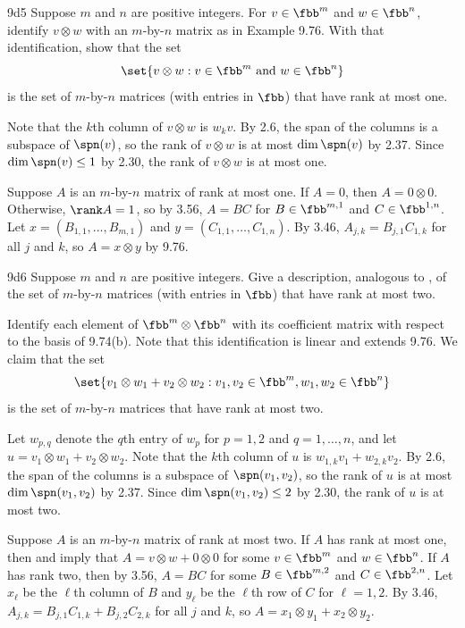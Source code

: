 \begin{exercise}{9d5}
    Suppose $m$ and $n$ are positive integers.
    For $v \in \fbb^m$ and $w \in \fbb^n$, identify $v \otimes w$ with an $m$-by-$n$ matrix as in Example 9.76.
    With that identification, show that the set
    \[
        \set{v \otimes w : v \in \fbb^m \text{ and } w \in \fbb^n}
    \]
    is the set of $m$-by-$n$ matrices (with entries in $\fbb$) that have rank at most one.
\end{exercise}

\begin{soliff}
    \rightset Note that the $k$th column of $v \otimes w$ is $w_k v$.
    By 2.6, the span of the columns is a subspace of $\spn(v)$, so the rank of $v \otimes w$ is at most $\dim \spn(v)$ by 2.37.
    Since $\dim \spn(v) \leq 1$ by 2.30, the rank of $v \otimes w$ is at most one.

    \leftset Suppose $A$ is an $m$-by-$n$ matrix of rank at most one.
    If $A = 0$, then $A = 0 \otimes 0$.
    Otherwise, $\rank A = 1$, so by 3.56, $A = BC$ for $B \in \fbb^{m, 1}$ and $C \in \fbb^{1, n}$.
    Let $x = (B_{1,1}, \ldots, B_{m,1})$ and $y = (C_{1,1}, \ldots, C_{1,n})$.
    By 3.46, $A_{j,k} = B_{j,1} C_{1,k}$ for all $j$ and $k$, so $A = x \otimes y$ by 9.76.
\end{soliff}

\begin{exercise}{9d6}
    Suppose $m$ and $n$ are positive integers.
    Give a description, analogous to , of the set of $m$-by-$n$ matrices (with entries in $\fbb$) that have rank at most two.
\end{exercise}

\begin{sol}
    Identify each element of $\fbb^m \otimes \fbb^n$ with its coefficient matrix with respect to the basis of 9.74(b).
    Note that this identification is linear and extends 9.76.
    We claim that the set
    \[
        \set{v_1 \otimes w_1 + v_2 \otimes w_2 : v_1, v_2 \in \fbb^m, w_1, w_2 \in \fbb^n}
    \]
    is the set of $m$-by-$n$ matrices that have rank at most two.
    
    \rightset Let $w_{p, q}$ denote the $q$th entry of $w_p$ for $p = 1, 2$ and $q = 1, \ldots, n$, and let $u = v_1 \otimes w_1 + v_2 \otimes w_2$.
    Note that the $k$th column of $u$ is $w_{1,k} v_1 + w_{2,k} v_2$.
    By 2.6, the span of the columns is a subspace of $\spn(v_1, v_2)$, so the rank of $u$ is at most $\dim \spn(v_1, v_2)$ by 2.37.
    Since $\dim \spn(v_1, v_2) \leq 2$ by 2.30, the rank of $u$ is at most two.

    \leftset Suppose $A$ is an $m$-by-$n$ matrix of rank at most two.
    If $A$ has rank at most one, then  and  imply that $A = v \otimes w + 0 \otimes 0$ for some $v \in \fbb^m$ and $w \in \fbb^n$.
    If $A$ has rank two, then by 3.56, $A = BC$ for some $B \in \fbb^{m, 2}$ and $C \in \fbb^{2, n}$.
    Let $x_\ell$ be the $\ell$th column of $B$ and $y_\ell$ be the $\ell$th row of $C$ for $\ell = 1, 2$.
    By 3.46, $A_{j,k} = B_{j,1} C_{1,k} + B_{j,2} C_{2,k}$ for all $j$ and $k$, so $A = x_1 \otimes y_1 + x_2 \otimes y_2$.
\end{sol}

